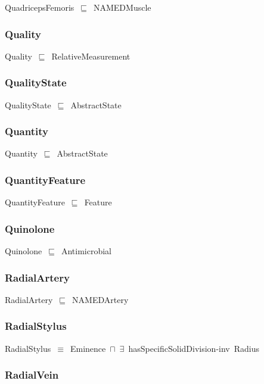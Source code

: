 \documentclass{article}
\begin{document}
QuadricepsFemoris~\ensuremath{\sqsubseteq}~NAMEDMuscle~

\subsubsection*{Quality}

Quality~\ensuremath{\sqsubseteq}~RelativeMeasurement~

\subsubsection*{QualityState}

QualityState~\ensuremath{\sqsubseteq}~AbstractState~

\subsubsection*{Quantity}

Quantity~\ensuremath{\sqsubseteq}~AbstractState~

\subsubsection*{QuantityFeature}

QuantityFeature~\ensuremath{\sqsubseteq}~Feature~

\subsubsection*{Quinolone}

Quinolone~\ensuremath{\sqsubseteq}~Antimicrobial~

\subsubsection*{RadialArtery}

RadialArtery~\ensuremath{\sqsubseteq}~NAMEDArtery~

\subsubsection*{RadialStylus}

RadialStylus~\ensuremath{\equiv}~Eminence~\ensuremath{\sqcap}~\ensuremath{\exists}~hasSpecificSolidDivision-inv~Radius

\subsubsection*{RadialVein}
\end{document}
